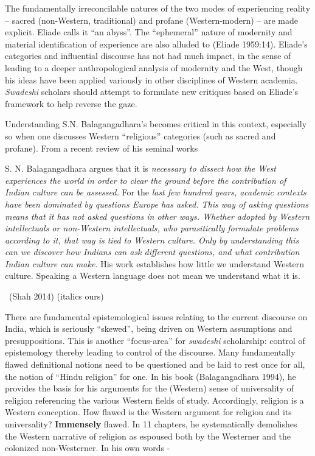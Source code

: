 The fundamentally irreconcilable natures of the two modes of experiencing reality – sacred (non-Western, traditional) and profane (Western-modern) – are made explicit. Eliade calls it “an abyss”. The “ephemeral” nature of modernity and material identification of experience are also alluded to (Eliade 1959:14). Eliade's categories and influential discourse has not had much impact, in the sense of leading to a deeper anthropological analysis of modernity and the West, though his ideas have been applied variously in other disciplines of Western academia. \textit{Swadeshi} scholars should attempt to formulate new critiques based on Eliade's framework to help reverse the gaze.

\newpage

Understanding S.N. Balagangadhara's becomes critical in this context, especially so when one discusses Western “religious” categories (such as sacred and profane). From a recent review of his seminal works

\begin{myquote}
S. N. Balagangadhara argues that it is \textit{necessary to dissect how the West experiences the world in order to clear the ground before the contribution of Indian culture can be assessed.} For the \textit{last few hundred years, academic contexts have been dominated by questions Europe has asked. This way of asking questions means that it has not asked questions in other ways. Whether adopted by Western intellectuals or non-Western intellectuals, who parasitically formulate problems according to it, that way is tied to Western culture. Only by understanding this can we discover how Indians can ask different questions, and what contribution Indian culture can make.} His work establishes how little we understand Western culture. Speaking a Western language does not mean we understand what it is. 

~\hfill (Shah 2014) (italics ours)
\end{myquote}

There are fundamental epistemological issues relating to the current discourse on India, which is seriously “skewed”, being driven on Western assumptions and presuppositions. This is another “focus-area” for \textit{swadeshi} scholarship: control of epistemology thereby leading to control of the discourse. Many fundamentally flawed definitional notions need to be questioned and be laid to rest once for all, the notion of “Hindu religion” for one. In his book (Balagangadhara 1994), he provides the basis for his arguments for the (Western) sense of universality of religion referencing the various Western fields of study. Accordingly, religion is a Western conception. How flawed is the Western argument for religion and its universality? \textbf{Immensely} flawed. In 11 chapters, he systematically demolishes the Western narrative of religion as espoused both by the Westerner and the colonized non-Westerner. In his own words -

